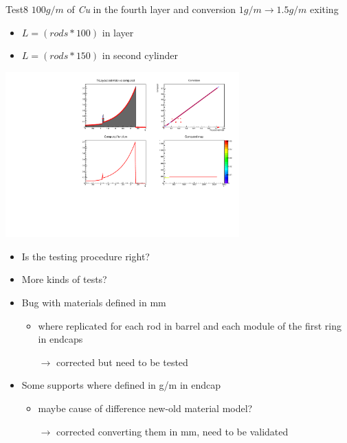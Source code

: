\documentclass[pdftex, 11pt]{beamer}
\begin{document}
\begin{frame}
  \begin{block}{Test8}
    \alert{$100 g/m$} of \emph{Cu} in the fourth layer and conversion \alert{$1g/m\to 1.5g/m$ exiting}
    \begin{itemize}
    \item \alert{$L=(rods*100)$} in layer
    \item \alert{$L=(rods*150)$} in second cylinder
    \end{itemize}
  \end{block}
  \begin{center}
    \includegraphics[width=9cm]{img/test8.pdf}
  \end{center}
\end{frame}

\begin{frame}
  \begin{itemize}
  \item Is the testing procedure right?
  \item More kinds of tests?
  \item \alert{Bug} with materials defined in mm
    \begin{itemize}
    \item where replicated for each \alert{rod} in \alert{barrel} and each module of the \alert{first ring} in \alert{endcaps}
    \item[$\to$] corrected but need to be tested
    \end{itemize}
  \item Some supports where defined in \alert{g/m} in endcap
    \begin{itemize}
    \item maybe cause of difference new-old material model?
    \item[$\to$] \alert{corrected} converting them in mm, need to be validated
    \end{itemize}
  \end{itemize}
\end{frame}
\end{document}
